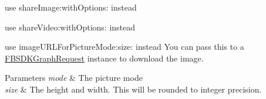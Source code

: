 \begin{DoxyRefList}
\item[\label{deprecated__deprecated000005}%
\hypertarget{deprecated__deprecated000005}{}%
Member \hyperlink{interface_f_b_s_d_k_messenger_sharer_a4af5604db5ffdf36755029085179cf3c}{\mbox{[}F\+B\+S\+D\+K\+Messenger\+Sharer share\+Image\+:with\+Metadata\+:with\+Context\+:\mbox{]}} ]use share\+Image\+:with\+Options\+: instead 
\item[\label{deprecated__deprecated000008}%
\hypertarget{deprecated__deprecated000008}{}%
Member \hyperlink{interface_f_b_s_d_k_messenger_sharer_ab55e08f8701ece3d8ddae583d766b55a}{\mbox{[}F\+B\+S\+D\+K\+Messenger\+Sharer share\+Video\+:with\+Metadata\+:with\+Context\+:\mbox{]}} ]use share\+Video\+:with\+Options\+: instead 
\item[\label{deprecated__deprecated000001}%
\hypertarget{deprecated__deprecated000001}{}%
Member \hyperlink{interface_f_b_s_d_k_profile_af0563cc4253d202a5d6db19698e34da4}{\mbox{[}F\+B\+S\+D\+K\+Profile image\+Path\+For\+Picture\+Mode\+:size\+:\mbox{]}} ]use {\ttfamily image\+U\+R\+L\+For\+Picture\+Mode\+:size\+:} instead  You can pass this to a {\ttfamily \hyperlink{interface_f_b_s_d_k_graph_request}{F\+B\+S\+D\+K\+Graph\+Request}} instance to download the image. 
\begin{DoxyParams}{Parameters}
{\em mode} & The picture mode \\
\hline
{\em size} & The height and width. This will be rounded to integer precision.  \\
\hline
\end{DoxyParams}


\end{DoxyRefList}
